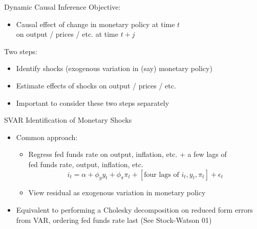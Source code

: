 \documentclass[11pt,aspectratio=169,xcolor={dvipsnames},hyperref={pdftex,pdfpagemode=UseNone,hidelinks,pdfdisplaydoctitle=true},usepdftitle=false]{beamer}
\begin{document}
\begin{frame}{Dynamic Causal Inference}
Objective:
\begin{itemize}
\item Causal effect of change in monetary policy at time $t$ \\ on output / prices / etc. at time $t+j$
\end{itemize}
\vspace{10pt}
Two steps:
\begin{itemize}
\item Identify shocks (exogenous variation in (say) monetary policy)
\item Estimate effects of shocks on output / prices / etc.
\end{itemize}
\vspace{10pt}
\begin{itemize}
\item Important to consider these two steps separately
\end{itemize}
\end{frame}


\begin{frame}{SVAR Identification of Monetary Shocks}
\begin{itemize}
\itemsep1em
\item Common approach:
\begin{itemize}
\item Regress fed funds rate on output, inflation, etc. + a few lags of \\ fed funds rate, output, inflation, etc.
\[ i_{t} = \alpha + \phi_{y} y_{t} + \phi_{\pi} \pi_{t} + [\mbox{four lags of } i_{t}, y_{t}, \pi_{t}] + \epsilon_{t} \]
\item View residual as exogenous variation in monetary policy
\end{itemize}
\item Equivalent to performing a Cholesky decomposition on reduced form errors from VAR, ordering fed funds rate last {\footnotesize (See Stock-Watson 01)}
\end{itemize}
\end{frame}
\end{document}
